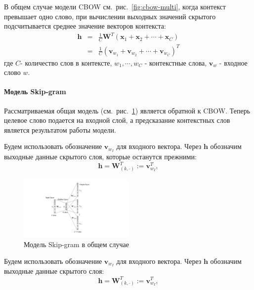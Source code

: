 В общем случае модели CBOW см.~рис.~\ref{fig:cbow-multi}, когда контекст превышает одно слово, при вычислении выходных значений скрытого подсчитывается среднее значение векторов контекста:
\begin{eqnarray}
\mathbf{h} &=& \frac{1}{C}\mathbf{W}^T(\mathbf{x}_1+\mathbf{x}_2+\cdots+\mathbf{x}_C) \\
&=& \frac{1}{C}(\mathbf{v}_{w_1} + \mathbf{v}_{w_2} + \cdots + \mathbf{v}_{w_C})^T
\label{eq:cbow-complex-h}
\end{eqnarray}
где $C$- количество слов в контексте, $w_1, \cdots, w_C$ - контекстные слова, $\mathbf{v}_w$  - входное слово $w$.



\paragraph{Модель Skip-gram}

Рассматриваемая общая модель (см.~рис.~\ref{fig:skip-gram-multi}) является обратной к CBOW. Теперь целевое слово подается на входной слой, а предсказание контекстных слов является результатом работы модели. 

Будем использовать обозначение $\mathbf{v}_{w_I}$ для входного вектора. Через $\mathbf{h}$ обозначим выходные данные скрытого слоя, которые останутся прежними:
\begin{equation}
\mathbf{h} = \mathbf{W}_{(k, \cdot)}^T := \mathbf{v}_{w_I}^T,
\end{equation}

\begin{figure}[t]
\centering
\includegraphics[width=0.5\textwidth]{img/skip-gram-multi.pdf}
\caption{\label{fig:skip-gram-multi} Модель Skip-gram в общем случае}
\end{figure}

Будем использовать обозначение  $\mathbf{v}_{w_I}$ для входного вектора. Через $\mathbf{h}$ обозначим выходные данные скрытого слоя:
\begin{equation}
\mathbf{h} = \mathbf{W}_{(k, \cdot)}^T := \mathbf{v}_{w_I}^T,
\end{equation}

